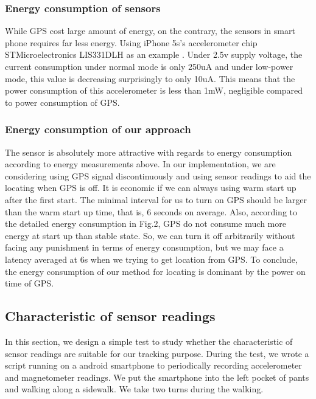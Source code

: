 \documentclass[journal]{IEEEtran}
\begin{document}
\subsubsection{Energy consumption of sensors} 
While GPS cost large amount of energy, on the contrary, the sensors in smart phone requires far less energy. 
Using iPhone 5s's accelerometer chip STMicroelectronics LIS331DLH as an example \cite{Acc Measurements}. 
Under 2.5v supply voltage, the current consumption under normal mode is only 250uA and under low-power mode, this value is decreasing surprisingly to only 10uA. 
This means that the power consumption of this accelerometer is less than 1mW, negligible compared to power consumption of GPS. 

\subsubsection{Energy consumption of our approach} 
The sensor is absolutely more attractive with regards to energy consumption according to energy measurements above. 
In our implementation, we are considering using GPS signal discontinuously and using sensor readings to aid the locating when GPS is off. 
It is economic if we can always using warm start up after the first start. The minimal interval for us to turn on GPS should be larger than the warm start up time, that is, 6 seconds on average.
Also, according to the detailed energy consumption in Fig.2, GPS do not consume much more energy at start up than stable state. 
So, we can turn it off arbitrarily without facing any punishment in terms of energy consumption, but we may face a latency averaged at 6s when we trying to get location from GPS.
To conclude, the energy consumption of our method for locating is dominant by the power on time of GPS.

\subsection{Characteristic of sensor readings}
In this section, we design a simple test to study whether the characteristic of sensor readings are suitable for our tracking purpose.
During the test, we wrote a script running on a android smartphone to periodically recording accelerometer and magnetometer readings. 
We put the smartphone into the left pocket of pants and walking along a sidewalk.
We take two turns during the walking.
\end{document}
